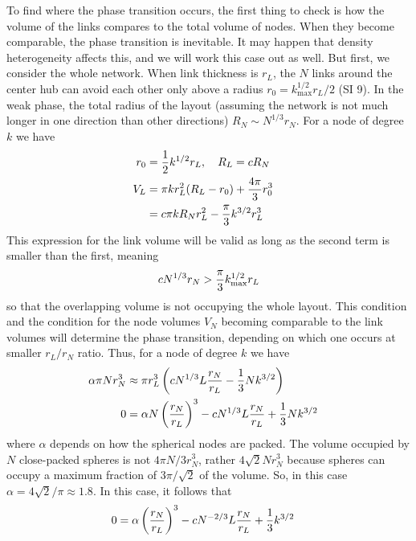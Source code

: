 \documentclass[linenumbers,endfloats,nofootinbib,preprint,floatfix,titlepage,superscriptaddress]{revtex4-1} %
\begin{document}
To find where the phase transition occurs, the first thing to check is how the volume of the links compares to the total volume of nodes. 
When they become comparable, the phase transition is inevitable. 
It may happen that density heterogeneity affects this, and we will work this case out as well.
But first, we consider the whole network.  
When link thickness is $r_L$, the $N$ links around the center hub can avoid each other only above a radius $r_0 = k^{1/2}_{\max} r_L /2 $ (SI 9). 
In the weak phase, the total radius of the layout (assuming the network is not much longer in one direction than other directions) $R_N \sim N^{1/3} r_N$. 
For a node of degree $k$ we have
\begin{align}
    r_0 & ={1\over 2}  k^{1/2} r_L, \quad R_L = c R_N \cr  
    V_L & = \pi k r_L^2 (R_L-r_0) + {4\pi\over 3} r_0^3 \cr 
    &= c\pi k R_N r_L^2 %
    - { \pi \over 3}k^{3/2} r_L^3  
    \label{eq:VL}
\end{align}
This expression for the link volume will be valid as long as the second term is smaller than the first, meaning
\[c N^{1/3} r_N >{\pi\over 3} k_{\max}^{1/2} r_L\]
so that the overlapping volume is not occupying the whole layout. 
This condition and the condition for the node volumes $V_N$ becoming comparable to the link volumes will determine the phase transition, depending on which one occurs at smaller $r_L/r_N$ ratio. 
Thus, for a node of degree $k$ we have
\begin{align}
    \alpha \pi N r_N^3 &\approx \pi r_L^3 \left(c N^{1/3}L  {r_N \over r_L} 
    - { 1\over 3}N {k^{3/2}}\right)\cr 
    0 &= \alpha N \left({r_N\over r_L}\right)^3 -c N^{1/3} L  {r_N \over r_L} 
    + { 1\over 3}N {k^{3/2}} 
\end{align}
where $\alpha $ depends on how the spherical nodes are packed.
The volume occupied by $N$ close-packed spheres is not $4\pi N /3 r_N^3$, rather $4\sqrt{2} N r_N^3$ because spheres can occupy a maximum fraction of $3\pi/\sqrt{2}$ of the volume. 
So, in this case $\alpha = 4\sqrt{2}/\pi \approx 1.8$. 
In this case, it follows that 
\begin{align}
    0 &= \alpha \pr{{r_N\over r_L}}^3 -c N^{-2/3} L  {r_N \over r_L} 
    + { 1\over 3} {k^{3/2}} %
    \label{eq:trans-full}
\end{align}
\end{document}
